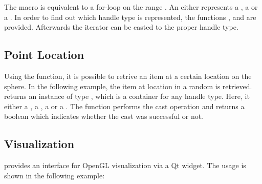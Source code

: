 The macro  is equivalent to a for-loop
on the range \ccc{[sf->sface_cycles_begin(), sf->sface_cycles_end())}. An 
 either represents a ,
a  or a . In order
to find out which handle type is represented, the functions
,  and  are provided.
Afterwards the iterator can be casted to the proper handle type.


\subsection{Point Location}

Using the  function, it is possible to retrive an item at a
certain location on the sphere. In the following example, the item at 
location  in a random  is 
retrieved.  returns an instance of type , which
is a container for any handle type. Here, it  either a 
, a , 
a  or a . The function 
 performs the cast operation and returns a boolean which
indicates whether the cast was successful or not.



\subsection{Visualization}


 provides an interface for OpenGL visualization via a
Qt widget. The usage is shown in the following example:


